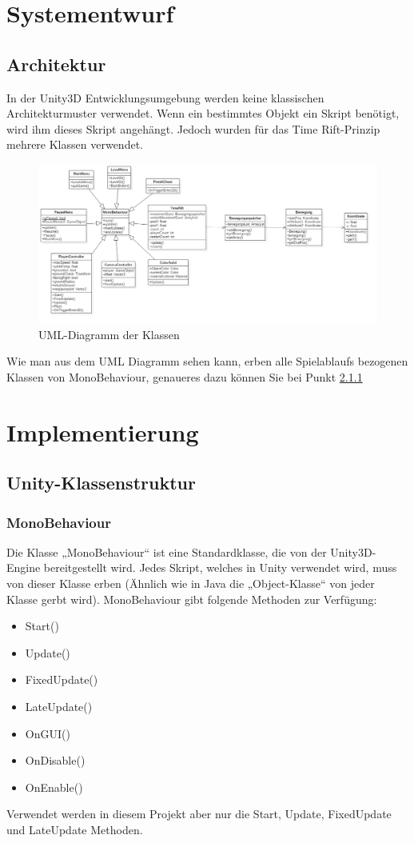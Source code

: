 \chapter{Systementwurf}

\section{Architektur}
\def \currentAuthor {Michael Leitner}
In der Unity3D Entwicklungsumgebung werden keine klassischen Architekturmuster verwendet. Wenn ein bestimmtes Objekt ein Skript benötigt, wird ihm dieses Skript angehängt. Jedoch wurden für das Time Rift-Prinzip mehrere Klassen verwendet.


\begin{figure}[H]
	\centering
	\includegraphics[width=15cm]{images/UML.png}
	\caption{UML-Diagramm der Klassen}		
\end{figure}

Wie man aus dem UML Diagramm sehen kann, erben alle Spielablaufs bezogenen Klassen von MonoBehaviour, genaueres dazu können Sie bei Punkt \ref{MonoBehaviour}

\chapter{Implementierung}
\section{Unity-Klassenstruktur}
\subsection{MonoBehaviour}	\label{MonoBehaviour}
Die Klasse „MonoBehaviour“ ist eine Standardklasse, die von der Unity3D-Engine bereitgestellt wird. Jedes Skript, welches in Unity verwendet wird, muss von dieser Klasse erben (Ähnlich wie in Java die „Object-Klasse“ von jeder Klasse gerbt wird). MonoBehaviour gibt folgende Methoden zur Verfügung:
\begin{itemize}
	\item Start()
	\item Update()
	\item FixedUpdate()
	\item LateUpdate()
	\item OnGUI()
	\item OnDisable()
	\item OnEnable()
\end{itemize}
Verwendet werden in diesem Projekt aber nur die Start, Update, FixedUpdate und LateUpdate Methoden.
